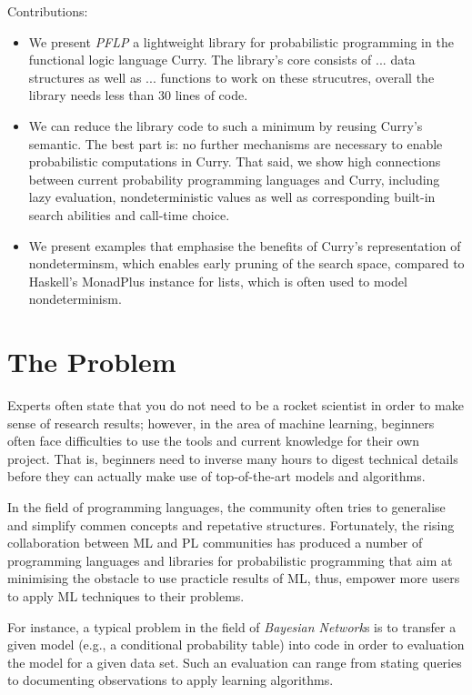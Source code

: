 \documentclass[
12pt, %
a4paper, %
oneside, %
]{llncs}
\begin{document}
Contributions:
\begin{itemize}
\item We present \emph{PFLP} a lightweight library for probabilistic
  programming in the functional logic language Curry. %
  The library's core consists of ... data structures as well as
  ... functions to work on these strucutres, overall the library needs
  less than 30 lines of code. %
\item We can reduce the library code to such a minimum by reusing Curry's
  semantic. %
  The best part is: no further mechanisms are necessary to enable
  probabilistic computations in Curry. %
  That said, we show high connections between current probability
  programming languages and Curry, including lazy evaluation,
  nondeterministic values as well as corresponding built-in search
  abilities and call-time choice. %
\item We present examples that emphasise the benefits of Curry's
  representation of nondeterminsm, which enables early pruning of the
  search space, compared to Haskell's MonadPlus instance for lists,
  which is often used to model nondeterminism. %
\end{itemize}

\section{The Problem}

Experts often state that you do not need to be a rocket scientist in
order to make sense of research results; however, in the area of
machine learning, beginners often face difficulties to use the tools
and current knowledge for their own project. %
That is, beginners need to inverse many hours to digest technical
details before they can actually make use of top-of-the-art models and
algorithms. %

In the field of programming languages, the community often tries to
generalise and simplify commen concepts and repetative structures. %
Fortunately, the rising collaboration between ML and PL communities
has produced a number of programming languages and libraries for
probabilistic programming that aim at minimising the obstacle to use
practicle results of ML, thus, empower more users to apply ML
techniques to their problems. %

For instance, a typical problem in the field of \emph{Bayesian
  Network}s is to transfer a given model (e.g., a conditional
probability table) into code in order to evaluation the model for a
given data set. %
Such an evaluation can range from stating queries to documenting
observations to apply learning algorithms. %
\end{document}
